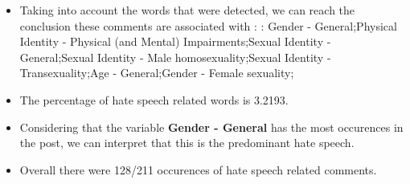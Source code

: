 \documentclass[11pt]{article}
\begin{document}
\begin{itemize}\item Taking into account the words that were detected, we can reach the conclusion these comments are associated with : : Gender - General;Physical Identity - Physical (and Mental) Impairments;Sexual Identity - General;Sexual Identity - Male homosexuality;Sexual Identity - Transexuality;Age - General;Gender - Female sexuality;%

\item The percentage of hate speech related words is 3.2193.

\item Considering that the variable \textbf{Gender - General} has the most occurences in the post, we can interpret that this is the predominant hate speech.

\item Overall there were 128/211 occurences of hate speech related comments.\end{itemize}
\end{document}
